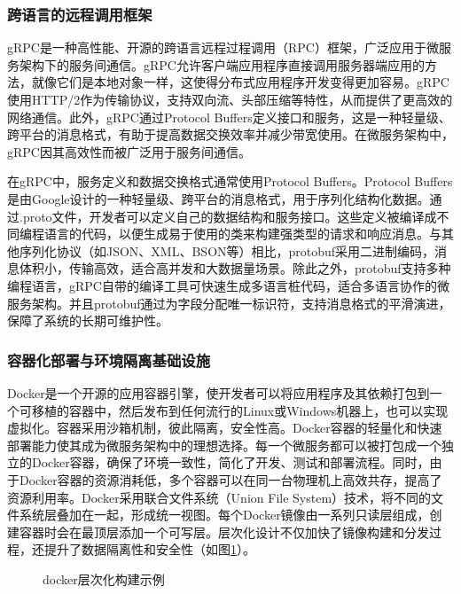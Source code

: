 \documentclass[UTF8,a4paper,12pt]{ctexart}
\numberwithin{equation}{section}
\begin{document}
\subsubsection{跨语言的远程调用框架}
gRPC是一种高性能、开源的跨语言远程过程调用（RPC）框架，广泛应用于微服务架构下的服务间通信。gRPC允许客户端应用程序直接调用服务器端应用的方法，就像它们是本地对象一样，这使得分布式应用程序开发变得更加容易。gRPC使用HTTP/2作为传输协议，支持双向流、头部压缩等特性，从而提供了更高效的网络通信。此外，gRPC通过Protocol Buffers定义接口和服务，这是一种轻量级、跨平台的消息格式，有助于提高数据交换效率并减少带宽使用。在微服务架构中，gRPC因其高效性而被广泛用于服务间通信。\par
在gRPC中，服务定义和数据交换格式通常使用Protocol Buffers。Protocol Buffers是由Google设计的一种轻量级、跨平台的消息格式，用于序列化结构化数据。通过.proto文件，开发者可以定义自己的数据结构和服务接口。这些定义被编译成不同编程语言的代码，以便生成易于使用的类来构建强类型的请求和响应消息。与其他序列化协议（如JSON、XML、BSON等）相比，protobuf采用二进制编码，消息体积小，传输高效，适合高并发和大数据量场景。除此之外，protobuf支持多种编程语言，gRPC自带的编译工具可快速生成多语言桩代码，适合多语言协作的微服务架构。并且protobuf通过为字段分配唯一标识符，支持消息格式的平滑演进，保障了系统的长期可维护性。

\subsubsection{容器化部署与环境隔离基础设施}
Docker是一个开源的应用容器引擎，使开发者可以将应用程序及其依赖打包到一个可移植的容器中，然后发布到任何流行的Linux或Windows机器上，也可以实现虚拟化。容器采用沙箱机制，彼此隔离，安全性高。Docker容器的轻量化和快速部署能力使其成为微服务架构中的理想选择。每一个微服务都可以被打包成一个独立的Docker容器，确保了环境一致性，简化了开发、测试和部署流程。同时，由于Docker容器的资源消耗低，多个容器可以在同一台物理机上高效共存，提高了资源利用率。Docker采用联合文件系统（Union File System）技术，将不同的文件系统层叠加在一起，形成统一视图。每个Docker镜像由一系列只读层组成，创建容器时会在最顶层添加一个可写层。层次化设计不仅加快了镜像构建和分发过程，还提升了数据隔离性和安全性（如图\ref{docker}）。\par
\begin{figure}[H]
	\caption{docker层次化构建示例}
	\label{docker}
\end{figure}
\end{document}
